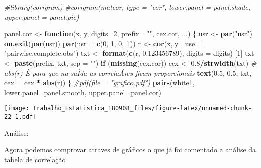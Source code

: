 \documentclass[]{article}
\newenvironment{Shaded}{\begin{snugshade}}{\end{snugshade}}
\newcommand{\KeywordTok}[1]{\textcolor[rgb]{0.13,0.29,0.53}{\textbf{#1}}}
\newcommand{\DataTypeTok}[1]{\textcolor[rgb]{0.13,0.29,0.53}{#1}}
\newcommand{\DecValTok}[1]{\textcolor[rgb]{0.00,0.00,0.81}{#1}}
\newcommand{\FloatTok}[1]{\textcolor[rgb]{0.00,0.00,0.81}{#1}}
\newcommand{\StringTok}[1]{\textcolor[rgb]{0.31,0.60,0.02}{#1}}
\newcommand{\CommentTok}[1]{\textcolor[rgb]{0.56,0.35,0.01}{\textit{#1}}}
\newcommand{\ControlFlowTok}[1]{\textcolor[rgb]{0.13,0.29,0.53}{\textbf{#1}}}
\newcommand{\OperatorTok}[1]{\textcolor[rgb]{0.81,0.36,0.00}{\textbf{#1}}}
\newcommand{\NormalTok}[1]{#1}
\begin{document}
\begin{Shaded}
\begin{Highlighting}[]
\CommentTok{#library(corrgram)}
\CommentTok{#corrgram(matcor, type = "cor", lower.panel = panel.shade, upper.panel = panel.pie)}

\NormalTok{panel.cor <-}\StringTok{ }\ControlFlowTok{function}\NormalTok{(x, y, }\DataTypeTok{digits=}\DecValTok{2}\NormalTok{, }\DataTypeTok{prefix =}\StringTok{""}\NormalTok{, cex.cor,}
\NormalTok{                      ...)  \{}
\NormalTok{  usr <-}\StringTok{ }\KeywordTok{par}\NormalTok{(}\StringTok{"usr"}\NormalTok{)}
  \KeywordTok{on.exit}\NormalTok{(}\KeywordTok{par}\NormalTok{(usr))}
  \KeywordTok{par}\NormalTok{(}\DataTypeTok{usr =} \KeywordTok{c}\NormalTok{(}\DecValTok{0}\NormalTok{, }\DecValTok{1}\NormalTok{, }\DecValTok{0}\NormalTok{, }\DecValTok{1}\NormalTok{))}
\NormalTok{  r <-}\StringTok{ }\KeywordTok{cor}\NormalTok{(x, y , }\DataTypeTok{use =} \StringTok{"pairwise.complete.obs"}\NormalTok{)}
\NormalTok{  txt <-}\StringTok{ }\KeywordTok{format}\NormalTok{(}\KeywordTok{c}\NormalTok{(r, }\FloatTok{0.123456789}\NormalTok{), }\DataTypeTok{digits =}\NormalTok{ digits) [}\DecValTok{1}\NormalTok{]}
\NormalTok{  txt <-}\StringTok{ }\KeywordTok{paste}\NormalTok{(prefix, txt, }\DataTypeTok{sep =} \StringTok{""}\NormalTok{)}
  \ControlFlowTok{if}\NormalTok{ (}\KeywordTok{missing}\NormalTok{(cex.cor))}
\NormalTok{    cex <-}\StringTok{ }\FloatTok{0.8}\OperatorTok{/}\KeywordTok{strwidth}\NormalTok{(txt)}
  \CommentTok{# abs(r) È para que na saÌda as correlaÁıes ficam proporcionais}
  \KeywordTok{text}\NormalTok{(}\FloatTok{0.5}\NormalTok{, }\FloatTok{0.5}\NormalTok{, txt, }\DataTypeTok{cex =}\NormalTok{ cex }\OperatorTok{*}\StringTok{ }\KeywordTok{abs}\NormalTok{(r))}
\NormalTok{\}}
\CommentTok{#pdf(file = "grafico.pdf")}
\KeywordTok{pairs}\NormalTok{(white1, }\DataTypeTok{lower.panel=}\NormalTok{panel.smooth, }\DataTypeTok{upper.panel=}\NormalTok{panel.cor)}
\end{Highlighting}
\end{Shaded}

\texttt{[image: Trabalho\_Estatistica\_180908\_files/figure-latex/unnamed-chunk-22-1.pdf]}

Análise:

Agora podemos comprovar atraves de gráficos o que já foi comentado a
análise da tabela de correlação
\end{document}
